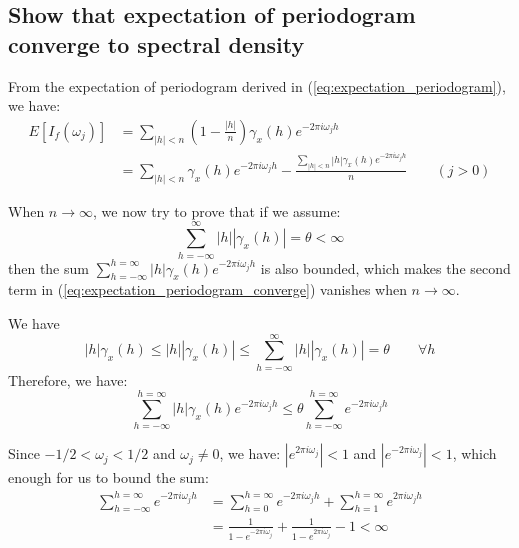 \subsection{Show that expectation of periodogram converge to spectral density}
From the expectation of periodogram derived in (\ref{eq:expectation_periodogram}), we have:
\begin{equation} \label{eq:expectation_periodogram_converge}
\begin{split}
E[I_f(\omega_j)] &= \sum_{|h|<n}(1-\frac{|h|}{n})\gamma_x(h) e^{-2\pi i \omega_j h} \\
&= \sum_{|h|<n}\gamma_x(h)e^{-2\pi i \omega_j h}  - \frac{\sum_{|h|<n} |h|\gamma_x(h)e^{-2\pi i \omega_j h}}{n}  \qquad (j > 0)
\end{split}
\end{equation}

When $n \rightarrow \infty$, we now try to prove that if we assume:
\begin{equation} \label{eq:periodogram_regularity_cond}
\sum_{h = - \infty}^{\infty} |h||\gamma_x(h)| = \theta < \infty
\end{equation}
then the sum $\sum_{h = -\infty}^{h = \infty} |h|\gamma_x(h)e^{-2\pi i \omega_j h}$ is also bounded, which makes the second term in (\ref{eq:expectation_periodogram_converge}) vanishes when $n \rightarrow \infty$.

We have
\begin{equation}
|h|\gamma_x(h) \leq |h||\gamma_x(h)| \leq \sum_{h = - \infty}^{\infty} |h||\gamma_x(h)| = \theta \qquad \forall h
\end{equation}
Therefore, we have:
\begin{equation}
\sum_{h = -\infty}^{h = \infty} |h|\gamma_x(h)e^{-2\pi i \omega_j h} \leq \theta \sum_{h = -\infty}^{h = \infty}e^{-2\pi i \omega_j h}
\end{equation}

Since $-1/2<\omega_j<1/2$ and $\omega_j \neq 0$, we have: $|e^{2\pi i \omega_j}| < 1$ and $|e^{-2\pi i \omega_j}| < 1$, which enough for us to bound the sum:
\begin{equation}
\begin{split}
\sum_{h = -\infty}^{h = \infty}e^{-2\pi i \omega_j h} &= \sum_{h = 0}^{h = \infty}e^{-2\pi i \omega_j h} + \sum_{h = 1}^{h = \infty}e^{2\pi i \omega_j h} \\
&= \frac{1}{1-e^{-2\pi i \omega_j}} + \frac{1}{1-e^{2\pi i \omega_j}} - 1 < \infty
\end{split}
\end{equation}

